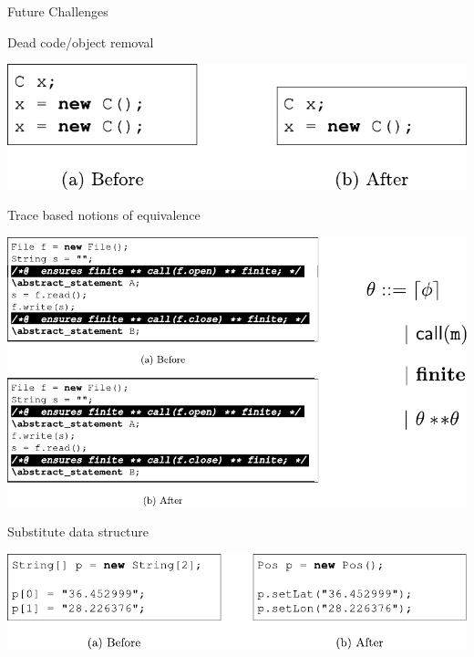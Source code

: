\begin{frame}
  \vfill
  \begin{center}
  { \Huge Future Challenges }
  \end{center}
  \vfill
\end{frame}

\begin{frame}{Dead code/object removal}
  \begin{center}
  \includegraphics{imported/Listing8}
  \end{center}
\end{frame}

\begin{frame}{Trace based notions of equivalence}
  \begin{center}
  \includegraphics[scale=.8]{imported/Traces-thick}
  \end{center}
\end{frame}

\begin{frame}{Substitute data structure}
  \begin{center}
  \includegraphics{imported/Listing10}
  \end{center}
\end{frame}
